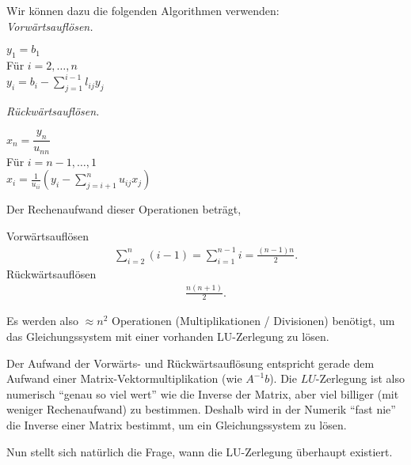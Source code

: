 Wir können dazu die folgenden Algorithmen verwenden:\\
\textit{Vorwärtsauflösen.}
\begin{tabbing}
\hspace{20pt}	$y_1 = b_1$\\
\hspace{20pt}	Für $i=2,\ldots,n$\\
\hspace{40pt}		$y_i = b_i - \sum\limits_{j=1}^{i-1} l_{ij}y_j$
\end{tabbing}
\textit{Rückwärtsauflösen.}
\begin{tabbing}
\hspace{20pt}	$x_n = \dfrac{y_n}{u_{nn}}$\\
\hspace{20pt}	Für $i=n-1,\ldots,1$\\
\hspace{40pt}		$x_i = \frac{1}{u_{ii}}\left(y_i - \sum\limits_{j=i+1}^n
u_{ij}x_j \right)$
\end{tabbing}
Der Rechenaufwand dieser Operationen beträgt,
\begin{bemn}[Rechenaufwand.]
Vorwärtsauflösen
\begin{align*}
\sum\limits_{i=2}^n (i-1) = \sum\limits_{i=1}^{n-1} i = \frac{(n-1)n}{2}.
\end{align*}
Rückwärtsauflösen
\begin{align*}
\frac{n(n+1)}{2}.
\end{align*}
\end{bemn}
Es werden also $\approx n^2$ Operationen (Multiplikationen / Divisionen)
benötigt, um das Gleichungssystem mit einer vorhanden LU-Zerlegung zu lösen.

Der Aufwand der Vorwärts- und Rückwärtsauflösung entspricht gerade dem Aufwand
einer Matrix-Vektormultiplikation (wie $A^{-1}b$). Die $LU$-Zerlegung ist also
numerisch ``genau so viel wert'' wie die Inverse der Matrix, aber viel
billiger (mit weniger Rechenaufwand) zu bestimmen. Deshalb wird in der Numerik
``fast nie'' die Inverse einer Matrix bestimmt, um ein Gleichungssystem zu lösen.

Nun stellt sich natürlich die Frage, wann die LU-Zerlegung überhaupt existiert.

